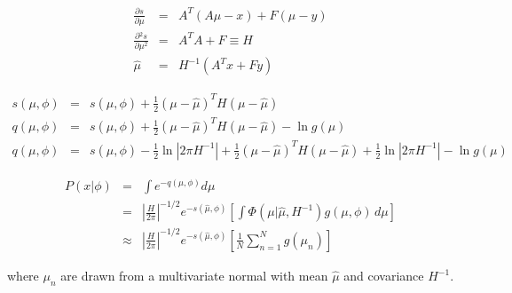 \documentclass{amsart}
\newcommand{\Dp}[2]{\ensuremath{\frac{\partial{#1}}{\partial{#2}}}}
\begin{document}
\begin{eqnarray}
  \Dp{s}{\mu} &=& A^T(A\mu-x) + F \left(\mu - y\right) \\
  \Dp{^2s}{\mu^2} &=& A^T\!A + F \equiv H \\
  \hat{\mu} &=& H^{-1}(A^T\!x + Fy)
\end{eqnarray}

\begin{eqnarray}
  s(\mu,\phi) &=& s(\hat{\mu},\phi) + \frac{1}{2}
  \left(\mu - \hat{\mu}\right)^T\! H 
  \left(\mu - \hat{\mu}\right) \\
  q(\mu,\phi) &=& s(\hat{\mu},\phi) + \frac{1}{2}
  \left(\mu - \hat{\mu}\right)^T\! H 
  \left(\mu - \hat{\mu}\right) 
  - \ln g(\mu) \\
  q(\mu,\phi) &=& s(\hat{\mu},\phi) 
  - \frac{1}{2}\ln\left|2\pi H^{-1}\right|
  + \frac{1}{2}
  \left(\mu - \hat{\mu}\right)^T\! H 
  \left(\mu - \hat{\mu}\right) 
  + \frac{1}{2}\ln\left|2\pi H^{-1}\right|
  - \ln g(\mu)
\end{eqnarray}

\begin{eqnarray}
  P(x|\phi) &=& \int\!e^{-q(\mu,\phi)}d\mu \\
  &=& 
  \left|\frac{H}{2\pi}\right|^{-1/2}\!e^{-s(\hat{\mu},\phi)}
  \left[ \int\!\Phi\!\left(\mu|\hat{\mu},H^{-1}\right) g(\mu,\phi)\,d\mu \right] \\
  &\approx&
  \left|\frac{H}{2\pi}\right|^{-1/2}\!e^{-s(\hat{\mu},\phi)}
  \left[\frac{1}{N}\sum_{n=1}^N g(\mu_n)\right]
  \label{eqn:marginalization}
\end{eqnarray}

where $\mu_n$ are drawn from a multivariate normal with mean
$\hat{\mu}$ and covariance $H^{-1}$.
\end{document}
